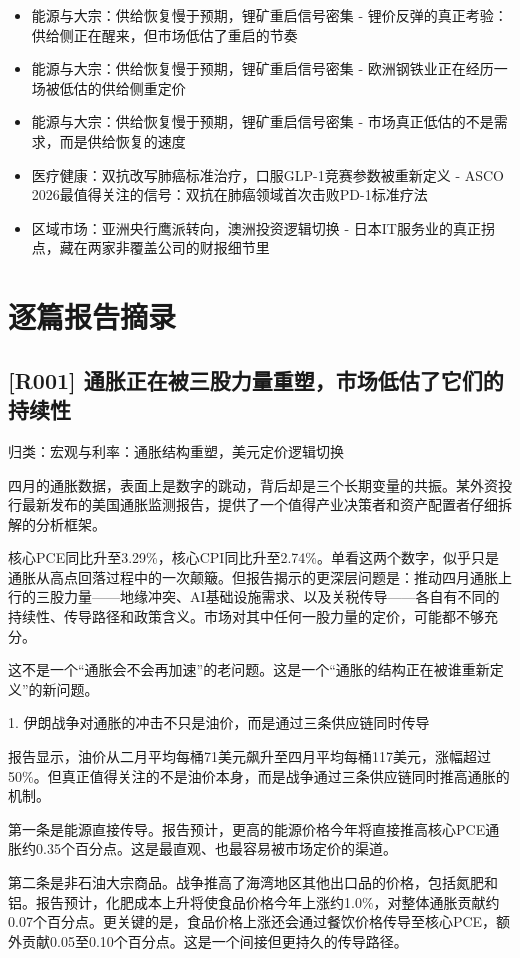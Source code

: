 \documentclass[11pt]{ctexart}
\begin{document}
\begin{itemize}
  \item [R033] 能源与大宗：供给恢复慢于预期，锂矿重启信号密集 - 锂价反弹的真正考验：供给侧正在醒来，但市场低估了重启的节奏
  \item [R034] 能源与大宗：供给恢复慢于预期，锂矿重启信号密集 - 欧洲钢铁业正在经历一场被低估的供给侧重定价
  \item [R035] 能源与大宗：供给恢复慢于预期，锂矿重启信号密集 - 市场真正低估的不是需求，而是供给恢复的速度
  \item [R036] 医疗健康：双抗改写肺癌标准治疗，口服GLP-1竞赛参数被重新定义 - ASCO 2026最值得关注的信号：双抗在肺癌领域首次击败PD-1标准疗法
  \item [R037] 区域市场：亚洲央行鹰派转向，澳洲投资逻辑切换 - 日本IT服务业的真正拐点，藏在两家非覆盖公司的财报细节里
\end{itemize}
\section{逐篇报告摘录}
\subsection{[R001] 通胀正在被三股力量重塑，市场低估了它们的持续性}
{\small\color{refgray}归类：宏观与利率：通胀结构重塑，美元定价逻辑切换}

四月的通胀数据，表面上是数字的跳动，背后却是三个长期变量的共振。某外资投行最新发布的美国通胀监测报告，提供了一个值得产业决策者和资产配置者仔细拆解的分析框架。

核心PCE同比升至3.29\%，核心CPI同比升至2.74\%。单看这两个数字，似乎只是通胀从高点回落过程中的一次颠簸。但报告揭示的更深层问题是：推动四月通胀上行的三股力量——地缘冲突、AI基础设施需求、以及关税传导——各自有不同的持续性、传导路径和政策含义。市场对其中任何一股力量的定价，可能都不够充分。

这不是一个“通胀会不会再加速”的老问题。这是一个“通胀的结构正在被谁重新定义”的新问题。

1. 伊朗战争对通胀的冲击不只是油价，而是通过三条供应链同时传导

报告显示，油价从二月平均每桶71美元飙升至四月平均每桶117美元，涨幅超过50\%。但真正值得关注的不是油价本身，而是战争通过三条供应链同时推高通胀的机制。

第一条是能源直接传导。报告预计，更高的能源价格今年将直接推高核心PCE通胀约0.35个百分点。这是最直观、也最容易被市场定价的渠道。

第二条是非石油大宗商品。战争推高了海湾地区其他出口品的价格，包括氮肥和铝。报告预计，化肥成本上升将使食品价格今年上涨约1.0\%，对整体通胀贡献约0.07个百分点。更关键的是，食品价格上涨还会通过餐饮价格传导至核心PCE，额外贡献0.05至0.10个百分点。这是一个间接但更持久的传导路径。
\end{document}
